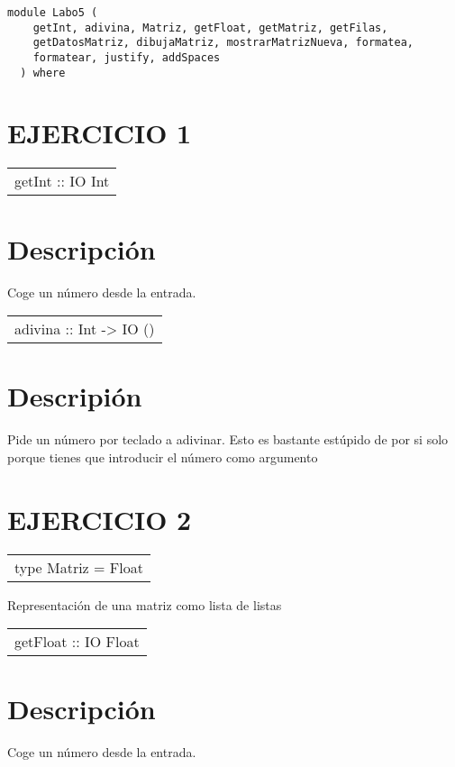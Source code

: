 \label{module:Labo5}
\haddockbeginheader
{\haddockverb\begin{verbatim}
module Labo5 (
    getInt, adivina, Matriz, getFloat, getMatriz, getFilas,
    getDatosMatriz, dibujaMatriz, mostrarMatrizNueva, formatea,
    formatear, justify, addSpaces
  ) where\end{verbatim}}
\haddockendheader

\section{EJERCICIO 1}
\begin{haddockdesc}
\item[\begin{tabular}{@{}l}
getInt :: IO Int
\end{tabular}]
{\haddockbegindoc
\section*{Descripción}
Coge un número desde la entrada.\par}
\end{haddockdesc}
\begin{haddockdesc}
\item[\begin{tabular}{@{}l}
adivina :: Int -> IO ()
\end{tabular}]
{\haddockbegindoc
\section*{Descripión}
Pide un número por teclado a adivinar. Esto es bastante estúpido de por si solo porque tienes que introducir el número como argumento\par}
\end{haddockdesc}
\section{EJERCICIO 2}
\begin{haddockdesc}
\item[\begin{tabular}{@{}l}
type Matriz = {\char 91}{\char 91}Float{\char 93}{\char 93}
\end{tabular}]
{\haddockbegindoc
Representación de una matriz como lista de listas\par}
\end{haddockdesc}
\begin{haddockdesc}
\item[\begin{tabular}{@{}l}
getFloat :: IO Float
\end{tabular}]
{\haddockbegindoc
\section*{Descripción}
Coge un número desde la entrada.\par}
\end{haddockdesc}
